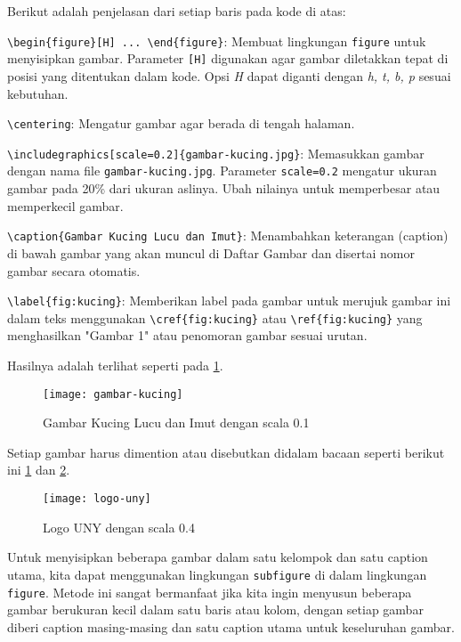 \noindent Berikut adalah penjelasan dari setiap baris pada kode di atas:

\begin{packed_enum}
    \item \texttt{\textbackslash begin\{figure\}[H] ... \textbackslash end\{figure\}}: Membuat lingkungan \texttt{figure} untuk menyisipkan gambar. Parameter \texttt{[H]} digunakan agar gambar diletakkan tepat di posisi yang ditentukan dalam kode. Opsi \textit{H} dapat diganti dengan \textit{h, t, b, p} sesuai kebutuhan.
    \item \texttt{\textbackslash centering}: Mengatur gambar agar berada di tengah halaman.
    \item \texttt{\textbackslash includegraphics[scale=0.2]\{gambar-kucing.jpg\}}: Memasukkan gambar dengan nama file \texttt{gambar-kucing.jpg}. Parameter \texttt{scale=0.2} mengatur ukuran gambar pada 20\% dari ukuran aslinya. Ubah nilainya untuk memperbesar atau memperkecil gambar.
    \item \texttt{\textbackslash caption\{Gambar Kucing Lucu dan Imut\}}: Menambahkan keterangan (caption) di bawah gambar yang akan muncul di Daftar Gambar dan disertai nomor gambar secara otomatis.
    \item \texttt{\textbackslash label\{fig:kucing\}}: Memberikan label pada gambar untuk merujuk gambar ini dalam teks menggunakan \texttt{\textbackslash cref\{fig:kucing\}} atau \texttt{\textbackslash ref\{fig:kucing\}} yang menghasilkan "Gambar 1" atau penomoran gambar sesuai urutan.
\end{packed_enum}

Hasilnya adalah terlihat seperti pada \cref{fig:kucing}.

\begin{figure}[H]
    \centering
    \texttt{[image: gambar-kucing]}
    \caption{Gambar Kucing Lucu dan Imut dengan scala 0.1}
    \label{fig:kucing}
\end{figure}

Setiap gambar harus dimention atau disebutkan didalam bacaan seperti berikut ini \cref{fig:kucing} dan \cref{fig:logoUNY}.

\begin{figure}[H]
    \centering
    \texttt{[image: logo-uny]}
    \caption{Logo UNY dengan scala 0.4}
    \label{fig:logoUNY}
\end{figure}

Untuk menyisipkan beberapa gambar dalam satu kelompok dan satu caption utama, kita dapat menggunakan lingkungan \texttt{subfigure} di dalam lingkungan \texttt{figure}. Metode ini sangat bermanfaat jika kita ingin menyusun beberapa gambar berukuran kecil dalam satu baris atau kolom, dengan setiap gambar diberi caption masing-masing dan satu caption utama untuk keseluruhan gambar.


